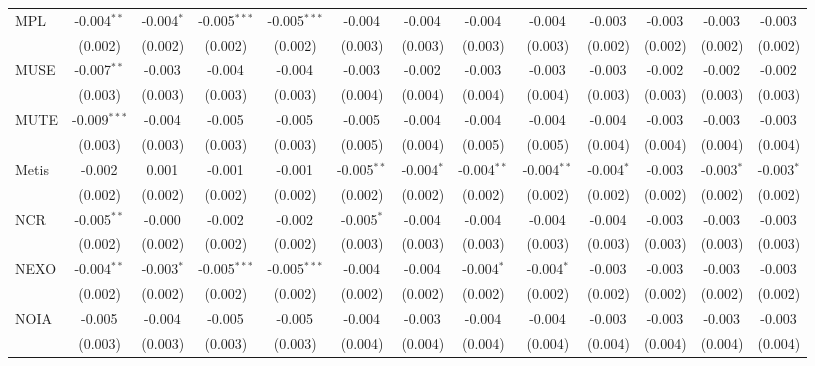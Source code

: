 \begin{table}[!htbp]
\begin{tabular}{@{\extracolsep{5pt}}lcccccccccccc}
 MPL & -0.004$^{**}$ & -0.004$^{*}$ & -0.005$^{***}$ & -0.005$^{***}$ & -0.004$^{}$ & -0.004$^{}$ & -0.004$^{}$ & -0.004$^{}$ & -0.003$^{}$ & -0.003$^{}$ & -0.003$^{}$ & -0.003$^{}$ \\
  & (0.002) & (0.002) & (0.002) & (0.002) & (0.003) & (0.003) & (0.003) & (0.003) & (0.002) & (0.002) & (0.002) & (0.002) \\
 MUSE & -0.007$^{**}$ & -0.003$^{}$ & -0.004$^{}$ & -0.004$^{}$ & -0.003$^{}$ & -0.002$^{}$ & -0.003$^{}$ & -0.003$^{}$ & -0.003$^{}$ & -0.002$^{}$ & -0.002$^{}$ & -0.002$^{}$ \\
  & (0.003) & (0.003) & (0.003) & (0.003) & (0.004) & (0.004) & (0.004) & (0.004) & (0.003) & (0.003) & (0.003) & (0.003) \\
 MUTE & -0.009$^{***}$ & -0.004$^{}$ & -0.005$^{}$ & -0.005$^{}$ & -0.005$^{}$ & -0.004$^{}$ & -0.004$^{}$ & -0.004$^{}$ & -0.004$^{}$ & -0.003$^{}$ & -0.003$^{}$ & -0.003$^{}$ \\
  & (0.003) & (0.003) & (0.003) & (0.003) & (0.005) & (0.004) & (0.005) & (0.005) & (0.004) & (0.004) & (0.004) & (0.004) \\
 Metis & -0.002$^{}$ & 0.001$^{}$ & -0.001$^{}$ & -0.001$^{}$ & -0.005$^{**}$ & -0.004$^{*}$ & -0.004$^{**}$ & -0.004$^{**}$ & -0.004$^{*}$ & -0.003$^{}$ & -0.003$^{*}$ & -0.003$^{*}$ \\
  & (0.002) & (0.002) & (0.002) & (0.002) & (0.002) & (0.002) & (0.002) & (0.002) & (0.002) & (0.002) & (0.002) & (0.002) \\
 NCR & -0.005$^{**}$ & -0.000$^{}$ & -0.002$^{}$ & -0.002$^{}$ & -0.005$^{*}$ & -0.004$^{}$ & -0.004$^{}$ & -0.004$^{}$ & -0.004$^{}$ & -0.003$^{}$ & -0.003$^{}$ & -0.003$^{}$ \\
  & (0.002) & (0.002) & (0.002) & (0.002) & (0.003) & (0.003) & (0.003) & (0.003) & (0.003) & (0.003) & (0.003) & (0.003) \\
 NEXO & -0.004$^{**}$ & -0.003$^{*}$ & -0.005$^{***}$ & -0.005$^{***}$ & -0.004$^{}$ & -0.004$^{}$ & -0.004$^{*}$ & -0.004$^{*}$ & -0.003$^{}$ & -0.003$^{}$ & -0.003$^{}$ & -0.003$^{}$ \\
  & (0.002) & (0.002) & (0.002) & (0.002) & (0.002) & (0.002) & (0.002) & (0.002) & (0.002) & (0.002) & (0.002) & (0.002) \\
 NOIA & -0.005$^{}$ & -0.004$^{}$ & -0.005$^{}$ & -0.005$^{}$ & -0.004$^{}$ & -0.003$^{}$ & -0.004$^{}$ & -0.004$^{}$ & -0.003$^{}$ & -0.003$^{}$ & -0.003$^{}$ & -0.003$^{}$ \\
  & (0.003) & (0.003) & (0.003) & (0.003) & (0.004) & (0.004) & (0.004) & (0.004) & (0.004) & (0.004) & (0.004) & (0.004) \\

\end{tabular}
\end{table}
